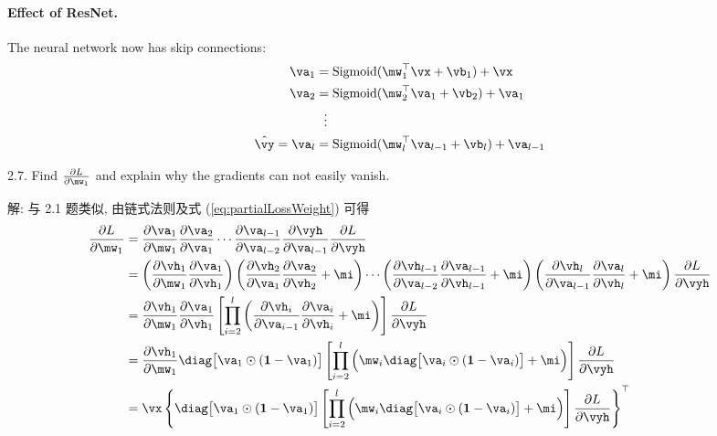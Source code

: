 \documentclass[openany]{ctexbook}
\theoremstyle{kaiti}
\theoremstyle{normal}
\begin{document}
\paragraph{Effect of ResNet.} The neural network now has skip connections: 
\begin{equation}
  \begin{aligned}
    \va_1&=\mathrm{Sigmoid}(\mw_1^\top\vx+\vb_1)+\vx\\
    \va_2&=\mathrm{Sigmoid}(\mw_2^\top\va_1+\vb_2)+\va_1\\
    &~~\vdots\\
    \hat{\vy}=\va_l&=\mathrm{Sigmoid}(\mw_l^\top\va_{l-1}+\vb_l)+\va_{l-1}\\
  \end{aligned}
\end{equation}

2.7. Find $\frac{\partial L}{\partial \mw_1}$ and explain why the gradients can not easily vanish.

解: 与 2.1 题类似, 由链式法则及式 (\ref{eq:partialLossWeight}) 可得
\begin{equation}
  \begin{aligned}
    \frac{\partial L}{\partial\mw_1}
    &=\frac{\partial\va_1}{\partial\mw_1}\frac{\partial\va_{2}}{\partial\va_{1}}\cdots\frac{\partial\va_{l-1}}{\partial\va_{l-2}}\frac{\partial\vyh}{\partial\va_{l-1}}\frac{\partial L}{\partial\vyh}\\
    &=\left(\frac{\partial\vh_1}{\partial\mw_1}
    \frac{\partial\va_{1}}{\partial\vh_{1}}\right)
    \left(\frac{\partial\vh_2}{\partial\va_1}
    \frac{\partial\va_{2}}{\partial\vh_{2}}+\mi\right)
    \cdots
    \left(\frac{\partial\vh_{l-1}}{\partial\va_{l-2}}
    \frac{\partial\va_{l-1}}{\partial\vh_{l-1}}+\mi\right)
    \left(\frac{\partial\vh_{l}}{\partial\va_{l-1}}
    \frac{\partial\va_l}{\partial\vh_{l}}+\mi\right)
    \frac{\partial L}{\partial\vyh}\\
    &=\frac{\partial\vh_1}{\partial\mw_1}
    \frac{\partial\va_{1}}{\partial\vh_{1}}
    \left[
      \prod_{i=2}^l
      \left(
        \frac{\partial\vh_i}{\partial\va_{i-1}}
        \frac{\partial\va_{i}}{\partial\vh_{i}}+\mi
      \right)
    \right]
    \frac{\partial L}{\partial\vyh}\\
    &=\frac{\partial\vh_1}{\partial\mw_1}
    \diag\big[\va_1\odot(\bm{1}-\va_1)\big]
    \left[
      \prod_{i=2}^l\Big(\mw_i\diag\big[\va_i\odot(\bm{1}-\va_i)\big]+\mi\Big)
    \right]
    \frac{\partial L}{\partial\vyh}\\
    &=\vx\left\{
      \diag\big[\va_1\odot(\bm{1}-\va_1)\big]
      \left[
        \prod_{i=2}^l\Big(\mw_i\diag\big[\va_i\odot(\bm{1}-\va_i)\big]+\mi\Big)
      \right]
      \frac{\partial L}{\partial\vyh}
    \right\}^\top\\
  \end{aligned}
\end{equation}
\end{document}

